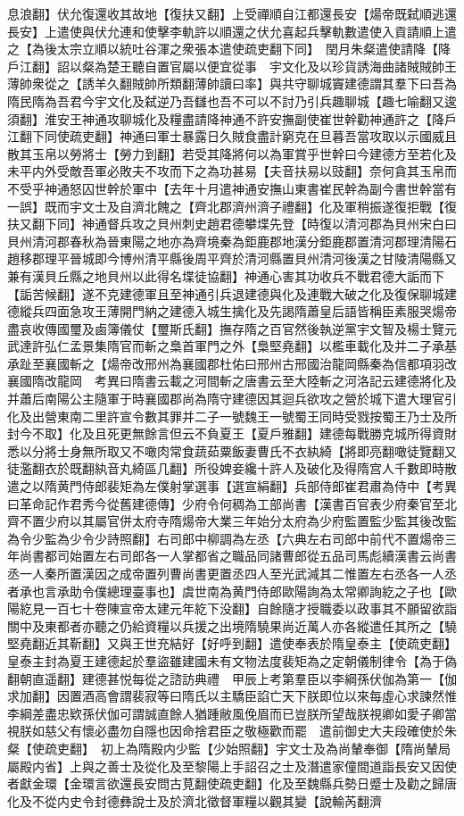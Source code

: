 息浪翻】伏允復還收其故地【復扶又翻】上受禪順自江都還長安【煬帝既弑順逃還長安】上遣使與伏允連和使擊李軌許以順還之伏允喜起兵擊軌數遣使入貢請順上遣之【為後太宗立順以統吐谷渾之衆張本遣使疏吏翻下同】　閏月朱粲遣使請降【降戶江翻】詔以粲為楚王聽自置官屬以便宜從事　宇文化及以珍貨誘海曲諸賊賊帥王薄帥衆從之【誘羊久翻賊帥所類翻薄帥讀曰率】與共守聊城竇建德謂其羣下曰吾為隋民隋為吾君今宇文化及弑逆乃吾讎也吾不可以不討乃引兵趣聊城【趣七喻翻又逡須翻】淮安王神通攻聊城化及糧盡請降神通不許安撫副使崔世幹勸神通許之【降戶江翻下同使疏吏翻】神通曰軍士暴露日久賊食盡計窮克在旦暮吾當攻取以示國威且散其玉帛以勞將士【勞力到翻】若受其降將何以為軍賞乎世幹曰今建德方至若化及未平内外受敵吾軍必敗夫不攻而下之為功甚易【夫音扶易以豉翻】奈何貪其玉帛而不受乎神通怒囚世幹於軍中【去年十月遣神通安撫山東書崔民幹為副今書世幹當有一誤】既而宇文士及自濟北餽之【齊北郡濟州濟子禮翻】化及軍稍振遂復拒戰【復扶又翻下同】神通督兵攻之貝州刺史趙君德攀堞先登【時復以清河郡為貝州宋白曰貝州清河郡春秋為晉東陽之地亦為齊境秦為鉅鹿郡地漢分鉅鹿郡置清河郡理清陽石趙移郡理平晉城即今博州清平縣後周平齊於清河縣置貝州清河後漢之甘陵清陽縣又兼有漢貝丘縣之地貝州以此得名堞徒協翻】神通心害其功收兵不戰君德大詬而下【詬苦候翻】遂不克建德軍且至神通引兵退建德與化及連戰大破之化及復保聊城建德縱兵四面急攻王薄開門納之建德入城生擒化及先謁隋蕭皇后語皆稱臣素服哭煬帝盡哀收傳國璽及鹵簿儀仗【璽斯氏翻】撫存隋之百官然後執逆黨宇文智及楊士覽元武達許弘仁孟景集隋官而斬之梟首軍門之外【梟堅堯翻】以檻車載化及并二子承基承趾至襄國斬之【煬帝改邢州為襄國郡杜佑曰邢州古邢國治龍岡縣秦為信都項羽改襄國隋改龍岡　考異曰隋書云載之河間斬之唐書云至大陸斬之河洛記云建德將化及并蕭后南陽公主隨軍于時襄國郡尚為隋守建德因其迴兵欲攻之營於城下遣大理官引化及出營東南二里許宣令數其罪并二子一號魏王一號蜀王同時受戮按蜀王乃士及所封今不取】化及且死更無餘言但云不負夏王【夏戶雅翻】建德每戰勝克城所得資財悉以分將士身無所取又不噉肉常食蔬茹粟飯妻曹氏不衣紈綺【將即亮翻噉徒覽翻又徒濫翻衣於既翻紈音丸綺區几翻】所役婢妾纔十許人及破化及得隋宫人千數即時散遣之以隋黄門侍郎裴矩為左僕射掌選事【選宣絹翻】兵部侍郎崔君肅為侍中【考異曰革命記作君秀今從舊建德傳】少府令何稠為工部尚書【漢書百官表少府秦官至北齊不置少府以其屬官併太府寺隋煬帝大業三年始分太府為少府監置監少監其後改監為令少監為少令少詩照翻】右司郎中柳調為左丞【六典左右司郎中前代不置煬帝三年尚書都司始置左右司郎各一人掌都省之職品同諸曹郎從五品司馬彪續漢書云尚書丞一人秦所置漢因之成帝置列曹尚書更置丞四人至光武減其二惟置左右丞各一人丞者承也言承助令僕總理臺事也】虞世南為黄門侍郎歐陽詢為太常卿詢紇之子也【歐陽紇見一百七十卷陳宣帝太建元年紇下没翻】自餘隨才授職委以政事其不願留欲詣關中及東都者亦聽之仍給資糧以兵援之出境隋驍果尚近萬人亦各縱遣任其所之【驍堅堯翻近其靳翻】又與王世充結好【好呼到翻】遣使奉表於隋皇泰主【使疏吏翻】皇泰主封為夏王建德起於羣盜雖建國未有文物法度裴矩為之定朝儀制律令【為于偽翻朝直遥翻】建德甚悦每從之諮訪典禮　甲辰上考第羣臣以李綱孫伏伽為第一【伽求加翻】因置酒高會謂裴寂等曰隋氏以主驕臣諂亡天下朕即位以來每虛心求諫然惟李綱差盡忠欵孫伏伽可謂誠直餘人猶踵敝風俛眉而已豈朕所望哉朕視卿如愛子卿當視朕如慈父有懷必盡勿自隱也因命捨君臣之敬極歡而罷　遣前御史大夫段確使於朱粲【使疏吏翻】　初上為隋殿内少監【少始照翻】宇文士及為尚輦奉御【隋尚輦局屬殿内省】上與之善士及從化及至黎陽上手詔召之士及潛遣家僮間道詣長安又因使者獻金環【金環言欲還長安問古莧翻使疏吏翻】化及至魏縣兵勢日蹙士及勸之歸唐化及不從内史令封德彝說士及於濟北徵督軍糧以觀其變【說輸芮翻濟